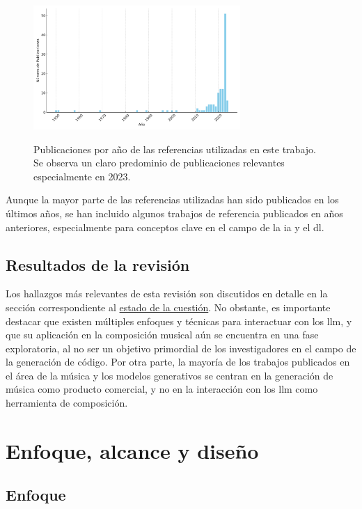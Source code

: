 \begin{figure}[h]
    \caption[Publicaciones por año de las referencias utilizadas]{Publicaciones por año de las referencias utilizadas en este trabajo. Se observa un claro predominio de publicaciones relevantes especialmente en 2023.}
    \centering
    \includegraphics[width=0.7\textwidth]{./figuras/publications_per_year_referencias.png}
    \source{\propio}
    \label{fig:publications_per_year_referencias}
\end{figure}

Aunque la mayor parte de las referencias utilizadas han sido publicados en los últimos años, se han incluido algunos trabajos de referencia publicados en años anteriores, especialmente para conceptos clave en el campo de la \gls{ia} y el \gls{dl}.

\subsection{Resultados de la revisión}
Los hallazgos más relevantes de esta revisión son discutidos en detalle en la sección correspondiente al \hyperref[chap:estado_cuestion]{estado de la cuestión}. No obstante, es importante destacar que existen múltiples enfoques y técnicas para interactuar con los \gls{llm}, y que su aplicación en la composición musical aún se encuentra en una fase exploratoria, al no ser un objetivo primordial de los investigadores en el campo de la generación de código. Por otra parte, la mayoría de los trabajos publicados en el área de la música y los modelos generativos se centran en la generación de música como producto comercial, y no en la interacción con los \gls{llm} como herramienta de composición. 

\section{Enfoque, alcance y diseño}

\subsection{Enfoque}

